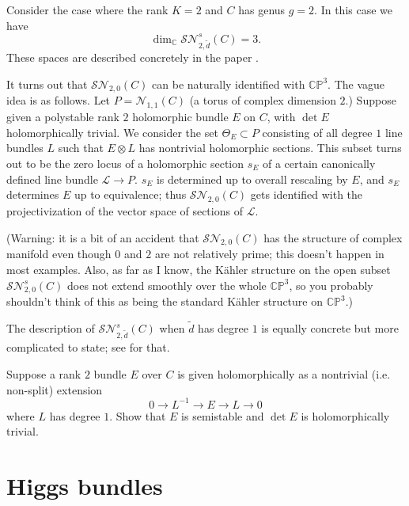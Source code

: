 \documentclass[12pt,letterpaper,reqno]{article}
\numberwithin{equation}{section}
\newcommand{\cL}{\ensuremath{\mathcal L}}
\newcommand{\cS}{\ensuremath{\mathcal S}}
\newcommand{\cN}{\ensuremath{\mathcal N}}
\newcommand{\C}{\ensuremath{\mathbb C}}
\newcommand{\PP}{\ensuremath{\mathbb P}}
\newcommand{\kahler}{K\"ahler\xspace}
\begin{document}
\begin{example} Consider the case where the rank $K=2$ and
$C$ has genus $g = 2$. In this case we have 
\begin{equation}
\dim_\C \cS\cN^s_{2,\tilde d}(C) = 3.  
\end{equation}
These spaces are described concretely 
in the paper \cite{MR0242185}. 

It turns out that
$\cS\cN_{2,0}(C)$ can be naturally identified with $\C\PP^3$. 
The vague idea is as follows. 
Let $P = \cN_{1,1}(C)$ (a torus of complex dimension $2$.)
Suppose given a polystable rank $2$ holomorphic bundle $E$ on $C$, with
$\det E$ holomorphically trivial.
We consider the set $\Theta_E \subset P$ consisting of all degree
$1$ line bundles $L$ such that $E \otimes L$ has nontrivial holomorphic
sections. This subset turns out to be the zero locus of a holomorphic 
section $s_E$ of 
a certain canonically defined line bundle $\cL \to P$.
$s_E$ is determined up to overall rescaling by $E$, and
$s_E$ determines $E$ up to equivalence; thus
$\cS\cN_{2,0}(C)$ gets identified with the projectivization
of the vector space of sections of $\cL$.

(Warning: it is a bit of an accident that $\cS\cN_{2,0}(C)$ 
has the structure of complex manifold even though $0$ and $2$
are not relatively prime; this doesn't happen in most 
examples. Also, as far as I know,
the \kahler structure on the open subset $\cS\cN^s_{2,0}(C)$
does not extend smoothly over the whole $\C\PP^3$, so you probably 
shouldn't think of this as being the standard \kahler structure on
$\C\PP^3$.)

The description of $\cS\cN^s_{2,\tilde d}(C)$ when $\tilde d$ has degree 
$1$ is equally concrete but more complicated to state; see \cite{MR0242185}
for that.

\end{example}


\begin{exercise} Suppose
a rank $2$ bundle $E$ over $C$ is given holomorphically as a
nontrivial (i.e. non-split) extension
\begin{equation} 
0 \to L^{-1} \to E \to L \to 0 
\end{equation}
where $L$ has degree $1$.
Show that $E$ is semistable and $\det E$ is holomorphically trivial.
\end{exercise}


\section{Higgs bundles}
\end{document}
